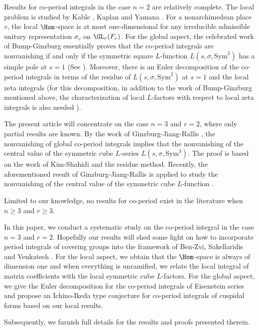 \documentclass[11pt,reqno]{amsart}
\newcommand{\Sym}{{\mathrm{Sym}}}\newcommand{\sgn}{{\mathrm{sgn}}}
\theoremstyle{plain}
\theoremstyle{remark} \newtheorem{remark}[thm]{Remark}
\theoremstyle{definition} \newtheorem{exercise}[thm]{Exercise}
\theoremstyle{definition} \newtheorem{example}[thm]{Example} \newtheorem{condition}[thm]{Condition}
\numberwithin{equation}{section}
\renewcommand{\-}{\text{--}}
\begin{document}
Results for co-period integrals in the case  $n=2$ are relatively complete.   The local problem is studied by Kable \cite{Kab01}, Kaplan \cite{Kap17} and  Yamana \cite{Yama17}. 
For a nonarchimedean place $v$, the  local $\Hom$-space is at most one-dimensional for any irreducible admissible unitary representation
$\sigma_v$ on $\GL_r(F_v)$. For the global aspect, the celebrated work of Bump-Ginzburg essentially proves that 
the co-period integrals are nonvanishing if and only if the symmetric square $L$-function $L(s,\sigma,\Sym^2)$ has a simple pole at $s=1$ (See \cite[Theorem 7.6]{BG92}). Moreover, there is an Euler decomposition of the co-period integrals in terms of the residue of 
$L(s,\sigma,\Sym^2)$ at $s=1$ and the local zeta integrals (for this decomposition, in addition to the work of Bump-Ginzburg mentioned above, 
the characterization of local $L$-factors with respect to local zeta integrals is also needed \cite{Yama17}).

The present article will concentrate on the case $n=3$ and $r=2$, where only partial results are known. By the work of Ginzburg-Jiang-Rallis \cite{GJR01}, the nonvanishing of global co-period integrals implies that the
nonvanishing of the central value of the symmetric cube $L$-series $L(s,\sigma,\Sym^3)$. The proof is based on the work of Kim-Shahidi \cite{KS99} and the residue method. Recently, the aforementioned result of
Ginzburg-Jiang-Rallis is applied to study the nonvanishing of the central value of the symmetric cube $L$-function \cite{HJL23}. 

Limited to our knowledge, no results for co-period  exist in the literature when $n \geq 3$ and $r \geq 3$.

In this paper, we conduct a systematic study on the co-period integral in the case $n=3$ and $r=2$. Hopefully our results will shed some light on how to incorporate period integrals of covering groups  into the framework of  Ben-Zvi, Sakellaridis and Venkatesh \cite{BZSV}.  For the local aspect, we obtain that the $\Hom$-space is always of dimension
one and when everything is unramified, we relate the local integral of matrix coefficients with the local symmetric cube $L$-factors. For the
global aspect,  we give the Euler decomposition for the co-period integrals of Eisenstein series and propose an Ichino-Ikeda type conjecture for co-period integrals of cuspidal forms based on our local results.

Subsequently, we furnish full details for the results and proofs presented therein. 
\end{document}
